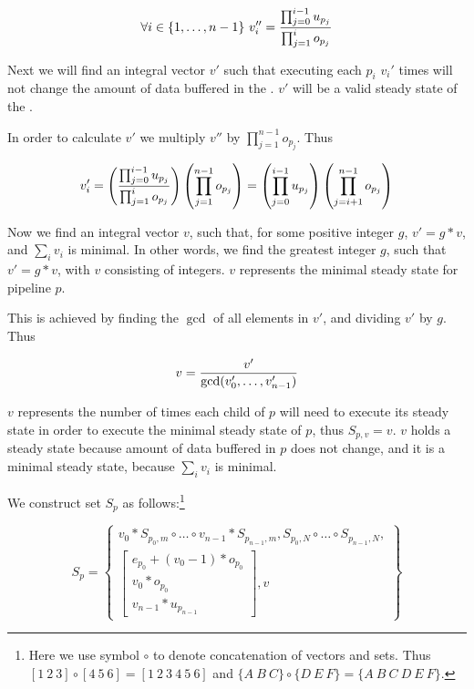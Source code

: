 \begin{displaymath}
\forall i \in \{1,\dots,n-1\}\ v_i'' = {\prod_{j = 0}^{i-1}
u_{p_j} \over \prod_{j=1}^i o_{p_j}}
\end{displaymath}

Next we will find an integral vector $v'$ such that executing each
$p_i$ $v_i'$ times will not change the amount of data buffered in
the {\pipeline}.  $v'$ will be a valid steady state of the
{\pipeline}.

In order to calculate $v'$ we multiply $v''$ by $\prod_{j=1}^{n-1}
o_{p_j}$.  Thus

\begin{displaymath}
v'_i = \left({\prod_{j = 0}^{i-1} u_{p_j} \over \prod_{j=1}^i
o_{p_j}} \right) \left(\prod_{j=1}^{n-1} o_{p_j} \right) = \left(
\prod_{j=0}^{i-1} u_{p_j} \right) \left( \prod_{j=i+1}^{n-1}
o_{p_j} \right)
\end{displaymath}

Now we find an integral vector $v$, such that, for some positive
integer $g$, $v' = g * v$, and $\sum_i v_i$ is minimal.  In other
words, we find the greatest integer $g$, such that $v' = g * v$,
with $v$ consisting of integers.  $v$ represents the minimal
steady state for pipeline $p$.

This is achieved by finding the $\gcd$ of all elements in $v'$,
and dividing $v'$ by $g$.  Thus

\begin{displaymath}
v = {v' \over \gcd(v'_0,\dots,v'_{n-1})}
\end{displaymath}

$v$ represents the number of times each child of $p$ will need to
execute its steady state in order to execute the minimal steady
state of $p$, thus $S_{p,v} = v$.  $v$ holds a steady state
because amount of data buffered in $p$ does not change, and it is
a minimal steady state, because $\sum_i v_i$ is minimal.

We construct set $S_p$ as follows:\footnote{Here we use symbol
$\circ$ to denote concatenation of vectors and sets.  Thus $[1\ 2\
3] \circ [4\ 5\ 6] = [1\ 2\ 3\ 4\ 5\ 6]$ and $\{A\ B\ C\} \circ
\{D\ E\ F\} = \{A\ B\ C\ D\ E\ F\}$.}

\begin{displaymath}
S_p = \left\{ \begin{array}{c} v_0 * S_{p_0,m} \circ \dots \circ
v_{n-1}
* S_{p_{n-1}, m}, S_{p_0, N} \circ \dots \circ S_{p_{n-1}, N}, \\
\left[
\begin{array}{c}
e_{p_0} + (v_0 - 1) * o_{p_0} \\
v_0 * o_{p_0} \\
v_{n-1} * u_{p_{n-1}}
\end{array}\right], v \end{array} \right\}
\end{displaymath}

